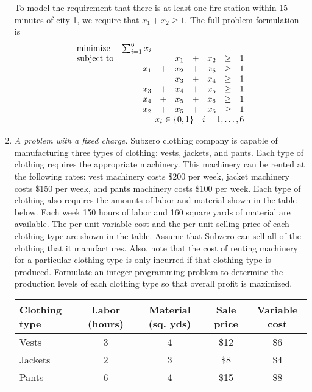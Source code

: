 \begin{enumerate}
\begin{solution}
To model the requirement that there is at least one fire station within
15 minutes of city 1, we require that $x_1 + x_2 \geq 1$. The full
problem formulation is
\[
\begin{array}{lrrrrrrl}
\textrm{minimize} & \sum_{i=1}^{6} x_i & & & & & & \\
\textrm{subject to} & & & x_1 & + & x_2 & \geq & 1 \\
 & x_1 & + & x_2 & + & x_6 & \geq & 1 \\
 &     &   & x_3 & + & x_4 & \geq & 1 \\
 & x_3 & + & x_4 & + & x_5 & \geq & 1 \\
 & x_4 & + & x_5 & + & x_6 & \geq & 1 \\
 & x_2 & + & x_5 & + & x_6 & \geq & 1 \\
 \multicolumn{8}{r}{x_i \in \{0,1\} \quad i = 1,\ldots,6}
\end{array}
\]
\end{solution}

\item \emph{A problem with a fixed charge.}
Subzero clothing company is capable of manufacturing three types of clothing:
vests, jackets, and pants. Each type of clothing requires the appropriate
machinery. This machinery can be rented at the following rates: vest machinery
costs \$200 per week, jacket machinery costs \$150 per week, and pants
machinery costs \$100 per week. Each type of clothing also requires the
amounts of labor and material shown in the table below. Each week 150 hours
of labor and 160 square yards of material are available. The per-unit variable
cost and the per-unit selling price of each clothing type are shown in the table. 
Assume that Subzero can sell all of the clothing that it manufactures.
Also, note that the cost of renting machinery for a particular clothing
type is only incurred if that clothing type is produced.
Formulate an integer programming problem to determine the production levels
of each clothing type so that overall profit is maximized.

\vspace{.1in}
\begin{tabulary}{4.5in}{LCCCC}
Clothing type
& Labor (hours) 
& Material (sq. yds) 
& Sale price 
& Variable cost \\ \hline
Vests   & 3 & 4 & \$12 & \$6 \\
Jackets & 2 & 3 & \$8 & \$4 \\
Pants   & 6 & 4 & \$15 & \$8
\end{tabulary}
\vspace{.1in}


\end{enumerate}
